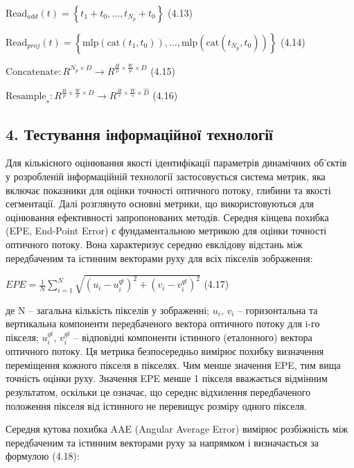 \documentclass[
]{article}
\begin{document}
\(\text{Read}_{add}(t) = \left\{ t_{1} + t_{0},\ldots,t_{N_{p}} + t_{0} \right\}\) (4.13)

\(\text{Read}_{proj}(t) = \left\{ \text{mlp}\left( \text{cat}\left( t_{1},t_{0} \right) \right),\ldots,\text{mlp}\left( \text{cat}\left( t_{N_{p}},t_{0} \right) \right) \right\}\) (4.14)

\(\text{Concatenate}:R^{N_{p} \times D} \rightarrow R^{\frac{H}{p} \times \frac{W}{p} \times D}\) (4.15)

\(\text{Resample}_{s}:R^{\frac{H}{p} \times \frac{W}{p} \times D} \rightarrow R^{\frac{H}{s} \times \frac{W}{s} \times \widehat{D}}\) (4.16)

\subsection{4. Тестування інформаційної технології}\label{ux442ux435ux441ux442ux443ux432ux430ux43dux43dux44f-ux456ux43dux444ux43eux440ux43cux430ux446ux456ux439ux43dux43eux457-ux442ux435ux445ux43dux43eux43bux43eux433ux456ux457}

Для кількісного оцінювання якості ідентифікації параметрів динамічних об'єктів у розробленій інформаційній технології застосовується система метрик, яка включає показники для оцінки точності оптичного потоку, глибини та якості сегментації. Далі розглянуто основні метрики, що використовуються для оцінювання ефективності запропонованих методів. Середня кінцева похибка (EPE, End-Point Error) є фундаментальною метрикою для оцінки точності оптичного потоку. Вона характеризує середню евклідову відстань між передбаченим та істинним векторами руху для всіх пікселів зображення:

\(EPE = \frac{1}{N}\sum_{i = 1}^{N}\sqrt{\left( u_{i} - u_{i}^{qt} \right)^{2} + \left( v_{i} - v_{i}^{qt} \right)^{2}}\) (4.17)

де N -- загальна кількість пікселів у зображенні; \(u_{i}\), \(v_{i}\) -- горизонтальна та вертикальна компоненти передбаченого вектора оптичного потоку для i-го пікселя; \(u_{i}^{gt}\), \(v_{i}^{gt}\) -- відповідні компоненти істинного (еталонного) вектора оптичного потоку. Ця метрика безпосередньо вимірює похибку визначення переміщення кожного пікселя в пікселях. Чим менше значення EPE, тим вища точність оцінки руху. Значення EPE менше 1 пікселя вважається відмінним результатом, оскільки це означає, що середнє відхилення передбаченого положення пікселя від істинного не перевищує розміру одного пікселя.

Середня кутова похибка AAE (Angular Average Error) вимірює розбіжність між передбаченим та істинним векторами руху за напрямком і визначається за формулою (4.18):
\end{document}
